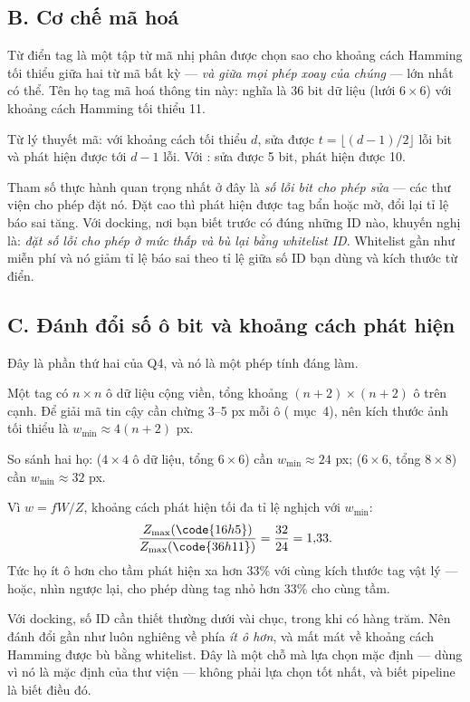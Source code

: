 \documentclass[../../marker.tex]{subfiles}
\begin{document}
\subsection{B. Cơ chế mã hoá}

Từ điển tag là một tập từ mã nhị phân được chọn sao cho khoảng cách Hamming tối thiểu giữa hai từ mã bất kỳ --- \emph{và giữa mọi phép xoay của chúng} --- lớn nhất có thể. Tên họ tag mã hoá thông tin này:  nghĩa là 36 bit dữ liệu (lưới \(6\times6\)) với khoảng cách Hamming tối thiểu 11.

Từ lý thuyết mã: với khoảng cách tối thiểu \(d\), sửa được \(t = \lfloor (d-1)/2 \rfloor\) lỗi bit và phát hiện được tới \(d-1\) lỗi. Với : sửa được 5 bit, phát hiện được 10.

Tham số thực hành quan trọng nhất ở đây là \emph{số lỗi bit cho phép sửa} --- các thư viện cho phép đặt nó. Đặt cao thì phát hiện được tag bẩn hoặc mờ, đổi lại tỉ lệ báo sai tăng. Với docking, nơi bạn biết trước có đúng những ID nào, khuyến nghị là: \emph{đặt số lỗi cho phép ở mức thấp và bù lại bằng whitelist ID}. Whitelist gần như miễn phí và nó giảm tỉ lệ báo sai theo tỉ lệ giữa số ID bạn dùng và kích thước từ điển.

\subsection{C. Đánh đổi số ô bit và khoảng cách phát hiện}

Đây là phần thứ hai của Q4, và nó là một phép tính đáng làm.

Một tag có \(n \times n\) ô dữ liệu cộng viền, tổng khoảng \((n+2) \times (n+2)\) ô trên cạnh. Để giải mã tin cậy cần chừng 3--5 px mỗi ô ( mục~4), nên kích thước ảnh tối thiểu là \(w_{\min} \approx 4(n+2)\) px.

So sánh hai họ:  (\(4\times4\) ô dữ liệu, tổng \(6\times6\)) cần \(w_{\min} \approx 24\) px;  (\(6\times6\), tổng \(8\times8\)) cần \(w_{\min} \approx 32\) px.

Vì \(w = fW/Z\), khoảng cách phát hiện tối đa tỉ lệ nghịch với \(w_{\min}\):
\[
\frac{Z_{\max}(\code{16h5})}{Z_{\max}(\code{36h11})} = \frac{32}{24} = 1{,}33.
\]
Tức họ ít ô hơn cho tầm phát hiện xa hơn 33\% với cùng kích thước tag vật lý --- hoặc, nhìn ngược lại, cho phép dùng tag nhỏ hơn 33\% cho cùng tầm.

Với docking, số ID cần thiết thường dưới vài chục, trong khi  có hàng trăm. Nên đánh đổi gần như luôn nghiêng về phía \emph{ít ô hơn}, và mất mát về khoảng cách Hamming được bù bằng whitelist. Đây là một chỗ mà lựa chọn mặc định --- dùng  vì nó là mặc định của thư viện --- không phải lựa chọn tốt nhất, và biết pipeline là biết điều đó.
\end{document}
